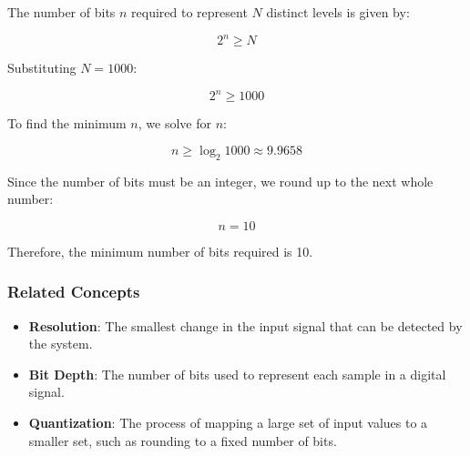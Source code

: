 The number of bits \(n\) required to represent \(N\) distinct levels is given by:

\[
2^n \geq N
\]

Substituting \(N = 1000\):

\[
2^n \geq 1000
\]

To find the minimum \(n\), we solve for \(n\):

\[
n \geq \log_2{1000} \approx 9.9658
\]

Since the number of bits must be an integer, we round up to the next whole number:

\[
n = 10
\]

Therefore, the minimum number of bits required is 10.

\subsubsection{Related Concepts}
\begin{itemize}
    \item \textbf{Resolution}: The smallest change in the input signal that can be detected by the system.
    \item \textbf{Bit Depth}: The number of bits used to represent each sample in a digital signal.
    \item \textbf{Quantization}: The process of mapping a large set of input values to a smaller set, such as rounding to a fixed number of bits.
\end{itemize}

